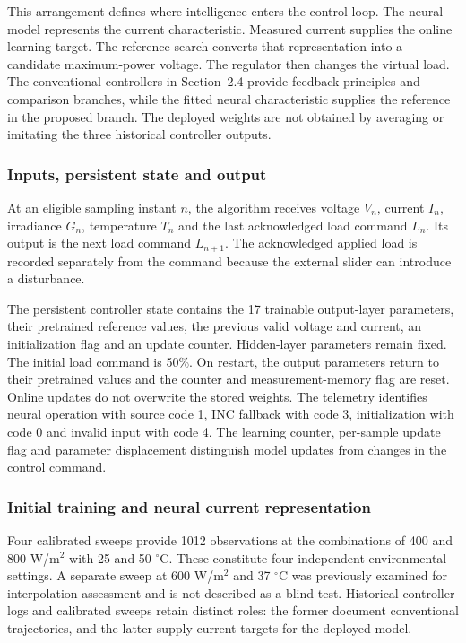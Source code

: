 \documentclass[Acad.Energy.,researcharticle,9pt,twoside,oneauthor]{Definitions/jams_academia}
\begin{document}
This arrangement defines where intelligence enters the control loop. The neural model represents the current characteristic. Measured current supplies the online learning target. The reference search converts that representation into a candidate maximum-power voltage. The regulator then changes the virtual load. The conventional controllers in Section~2.4 provide feedback principles and comparison branches, while the fitted neural characteristic supplies the reference in the proposed branch. The deployed weights are not obtained by averaging or imitating the three historical controller outputs.

\subsubsection{Inputs, persistent state and output}
At an eligible sampling instant $n$, the algorithm receives voltage $V_n$, current $I_n$, irradiance $G_n$, temperature $T_n$ and the last acknowledged load command $L_n$. Its output is the next load command $L_{n+1}$. The acknowledged applied load is recorded separately from the command because the external slider can introduce a disturbance.

The persistent controller state contains the 17 trainable output-layer parameters, their pretrained reference values, the previous valid voltage and current, an initialization flag and an update counter. Hidden-layer parameters remain fixed. The initial load command is 50\%. On restart, the output parameters return to their pretrained values and the counter and measurement-memory flag are reset. Online updates do not overwrite the stored weights. The telemetry identifies neural operation with source code 1, INC fallback with code 3, initialization with code 0 and invalid input with code 4. The learning counter, per-sample update flag and parameter displacement distinguish model updates from changes in the control command.

\subsubsection{Initial training and neural current representation}
Four calibrated sweeps provide 1012 observations at the combinations of 400 and 800 W/m$^2$ with 25 and 50 $^\circ$C. These constitute four independent environmental settings. A separate sweep at 600 W/m$^2$ and 37 $^\circ$C was previously examined for interpolation assessment and is not described as a blind test. Historical controller logs and calibrated sweeps retain distinct roles: the former document conventional trajectories, and the latter supply current targets for the deployed model.
\end{document}
